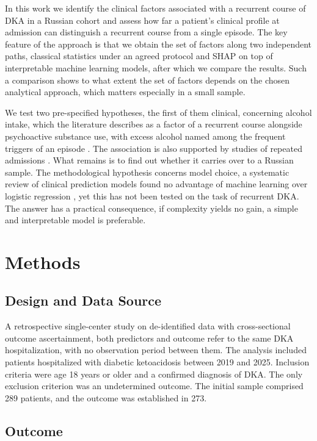 \documentclass[pdflatex,sn-basic,Numbered]{sn-jnl}
\begin{document}
In this work we identify the clinical factors associated with a recurrent course of DKA in a Russian cohort and assess how far a patient's clinical profile at admission can distinguish a recurrent course from a single episode. The key feature of the approach is that we obtain the set of factors along two independent paths, classical statistics under an agreed protocol and SHAP on top of interpretable machine learning models, after which we compare the results. Such a comparison shows to what extent the set of factors depends on the chosen analytical approach, which matters especially in a small sample.

We test two pre-specified hypotheses, the first of them clinical, concerning alcohol intake, which the literature describes as a factor of a recurrent course alongside psychoactive substance use, with excess alcohol named among the frequent triggers of an episode \cite{ref7}. The association is also supported by studies of repeated admissions \cite{ref9,ref16}. What remains is to find out whether it carries over to a Russian sample. The methodological hypothesis concerns model choice, a systematic review of clinical prediction models found no advantage of machine learning over logistic regression \cite{ref17}, yet this has not been tested on the task of recurrent DKA. The answer has a practical consequence, if complexity yields no gain, a simple and interpretable model is preferable.

\section{Methods}\label{sec2}

\subsection{Design and Data Source}\label{subsec2_1}

A retrospective single-center study on de-identified data with cross-sectional outcome ascertainment, both predictors and outcome refer to the same DKA hospitalization, with no observation period between them. The analysis included patients hospitalized with diabetic ketoacidosis between 2019 and 2025. Inclusion criteria were age 18 years or older and a confirmed diagnosis of DKA. The only exclusion criterion was an undetermined outcome. The initial sample comprised 289 patients, and the outcome was established in 273.

\subsection{Outcome}\label{subsec2_2}
\end{document}
